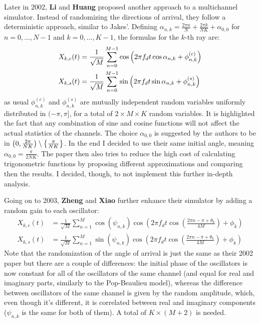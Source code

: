 Later in 2002, \textbf{Li} and \textbf{Huang} \cite{C1} proposed another approach to a multichannel simulator. Instead of randomizing the directions of arrival, they follow a deterministic approach, similar to Jakes'. Defining $\alpha_{n,k} = \frac{2\pi n}{N} + \frac{2 \pi k}{NK} + \alpha_{0,0}$ for $n = 0,...,N-1$ and $k=0,...,K-1$, the formulas for the $k$-th ray are:%
%
\begin{subequations}
\begin{align}
X_{k,c}(t) &= \frac{1}{\sqrt{M}} \sum_{n=0}^{M-1} \cos \qty( 2\pi f_d t \cos \alpha_{n,k} + \phi_{n,k}^{(c)} )\\
X_{k,s}(t) &= \frac{1}{\sqrt{M}} \sum_{n=0}^{M-1} \sin \qty( 2\pi f_d t \sin \alpha_{n,k} + \phi_{n,k}^{(s)} )
\end{align}
\end{subequations}%
%
as usual $\phi_{n,k}^{(c)}$ and $\phi_{n,k}^{(s)}$ are mutually independent random variables uniformly distributed in $(-\pi,\pi]$, for a total of $2\times M \times K$ random variables. It is highlighted the fact that any combination of sine and cosine functions will not affect the actual statistics of the channels. The choice $\alpha_{0,0}$ is suggested by the authors to be in $\qty(0,\frac{2\pi}{NK}) \setminus \qty{\frac{\pi}{NK}}$. In the end I decided to use their same initial angle, meaning $\alpha_{0,0} = \frac{\pi}{2NK}$. The paper then also tries to reduce the high cost of calculating trigonometric functions by proposing different approximations and comparing then the results. I decided, though, to not implement this further in-depth analysis.

Going on to 2003, \textbf{Zheng} and \textbf{Xiao} \cite{A2} further enhance their simulator by adding a random gain to each oscillator:%
%
\begin{subequations}
\begin{align}
X_{k,c}(t) &= \frac{1}{\sqrt{M}} \sum_{n=1}^{M} \cos(\psi_{n,k})\cos \left( 2\pi f_d t \cos \left( \frac{2\pi n - \pi + \theta_k}{4M}\right) + \phi_k \right)\\
X_{k,s}(t) &= \frac{1}{\sqrt{M}} \sum_{n=1}^{M} \sin(\psi_{n,k})\cos \left( 2\pi f_d t \cos \left( \frac{2\pi n - \pi + \theta_k}{4M}\right) + \phi_k \right)
\end{align}
\end{subequations}%
%
Note that the randomization of the angle of arrival is just the same as their 2002 paper but there are a couple of differences: the initial phase of the oscillators is now constant for all of the oscillators of the same channel (and equal for real and imaginary parts, similarly to the Pop-Beaulieu model), whereas the difference between oscillators of the same channel is given by the random amplitude, which, even though it's different, it is correlated between real and imaginary components ($\psi_{n,k}$ is the same for both of them). A total of $K \times (M+2)$ is needed.

